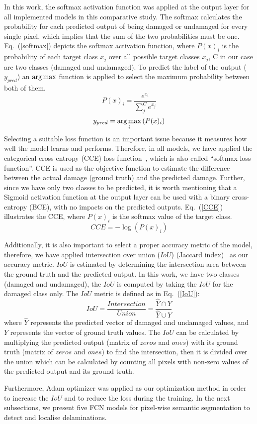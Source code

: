 In this work, the softmax activation function was applied at the output layer for all implemented models in this comparative study.
The softmax calculates the probability for each predicted output of being damaged or undamaged for every single pixel, which implies that the sum of the two probabilities must be one. 
Eq.~(\ref{softmax}) depicts the softmax activation function, where \(P(x)_{i}\) is the probability of each target class \(x_{j}\) over all possible target classes \(x_{j}\), C in our case are two classes  (damaged and undamaged).
To predict the label of the output (\(y_{pred}\)) an \(\operatorname*{arg\,max}\) function is applied to select the maximum probability between both of them.
	\begin{equation}
		P(x)_{i} = \frac{e^{x_{i}}}{\sum_{j}^{C} e^{x_{j}}}
		\label{softmax}
	\end{equation} 
	\begin{equation}
		y_{pred} = \operatorname*{arg\,max}_{i}\left( P(x)_{i} \right)
		\label{argmax}
	\end{equation}
Selecting a suitable loss function is an important issue because it measures how well the model learns and performs.
Therefore, in all models, we have applied the categorical cross-entropy (CCE) loss function~\cite{Bonaccorso2020}, which is also called \enquote{softmax loss function}.
CCE is used as the objective function to estimate the difference between the actual damage (ground truth) and the predicted damage.
Further, since we have only two classes to be predicted, it is worth mentioning that a Sigmoid activation function at the output layer can be used with a binary cross-entropy (BCE), with no impacts on the predicted outputs.
Eq.~(\ref{CCE}) illustrates the CCE, where \( P(x)_{i}\) is the softmax value of the target class. 
	\begin{equation}
	CCE = -\log\left( P(x)_{i} \right)
	\label{CCE}
	\end{equation}

Additionally, it is also important to select a proper accuracy metric of the model, therefore, we have applied intersection over union (\(IoU\)) (Jaccard index)~\cite{Bertels2019} as our accuracy metric. 
\(IoU\) is estimated by determining the intersection area between the ground truth and the predicted output.
In this work, we have two classes (damaged and undamaged), the \(IoU\) is computed by taking the \(IoU\) for the damaged class only.
The \(IoU\) metric is defined as in Eq.~(\ref{IoU}):
\begin{equation}
IoU = \frac{Intersection}{Union} = \frac{\hat{Y} \cap Y}{\hat{Y} \cup Y} 
\label{IoU}
\end{equation}
where \(\hat{Y}\) represents the predicted vector of damaged and undamaged values, and \(Y\) represents the vector of ground truth values.
The \(IoU\) can be calculated by multiplying the predicted output (matrix of \(zeros\) and \(ones\)) with its ground truth (matrix of \(zeros\) and \(ones\)) to find the intersection, then it is divided over the union which can be calculated by counting all pixels with non-zero values of the predicted output and its ground truth.

Furthermore, Adam optimizer was applied as our optimization method in order to increase the \(IoU\) and to reduce the loss during the training.
In the next subsections, we present five FCN models for pixel-wise semantic segmentation to detect and localise delaminations.